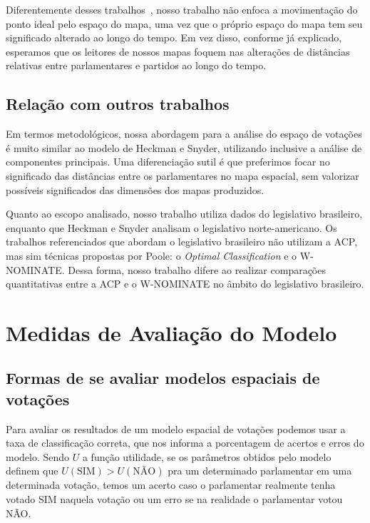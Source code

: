 \documentclass[
	article,			%
	12pt,				%
	oneside,			%
	a4paper,			%
	english,			%
	brazil,				%
	sumario=tradicional,
	oldfontcommands %
	]{abntex2}
\newcommand\nay{NÃO\xspace}
\newcommand\yea{SIM\xspace}
\newcommand\wnominate{W-NOMINATE\xspace}
\begin{document}
Diferentemente desses trabalhos~\cite{poole2001dnomiante, heckman-snyder1997}, nosso trabalho não enfoca a movimentação do ponto ideal pelo espaço do mapa, uma vez que o próprio espaço do mapa tem seu significado alterado ao longo do tempo. Em vez disso, conforme já explicado, esperamos que os leitores de nossos mapas foquem nas alterações de distâncias relativas entre parlamentares e partidos ao longo do tempo.


\subsection{Relação com outros trabalhos}

Em termos metodológicos, nossa abordagem para a análise do espaço de votações é muito similar ao modelo de Heckman e Snyder, utilizando inclusive a análise de componentes principais. Uma diferenciação sutil é que preferimos focar no significado das distâncias entre os parlamentares no mapa espacial, sem valorizar possíveis significados das dimensões dos mapas produzidos.

Quanto ao escopo analisado, nosso trabalho utiliza dados do legislativo brasileiro, enquanto que Heckman e Snyder analisam o legislativo norte-americano. Os trabalhos referenciados que abordam o legislativo brasileiro não utilizam a ACP, mas sim técnicas propostas por Poole: o \emph{Optimal Classification} e o \wnominate. Dessa forma, nosso trabalho difere ao realizar comparações quantitativas entre a ACP e o \wnominate no âmbito do legislativo brasileiro.


\section{Medidas de Avaliação do Modelo}
\label{sec:avaliacao}

\subsection{Formas de se avaliar modelos espaciais de votações}

Para avaliar os resultados de um modelo espacial de votações podemos usar a taxa de classificação correta, que nos informa a porcentagem de acertos e erros do modelo. Sendo $U$ a função utilidade, se os parâmetros obtidos pelo modelo definem que $U(\textrm{SIM}) > U(\textrm{NÃO})$ pra um determinado parlamentar em uma determinada votação, temos um acerto caso o parlamentar realmente tenha votado \yea naquela votação ou um erro se na realidade o parlamentar votou \nay.
\end{document}
